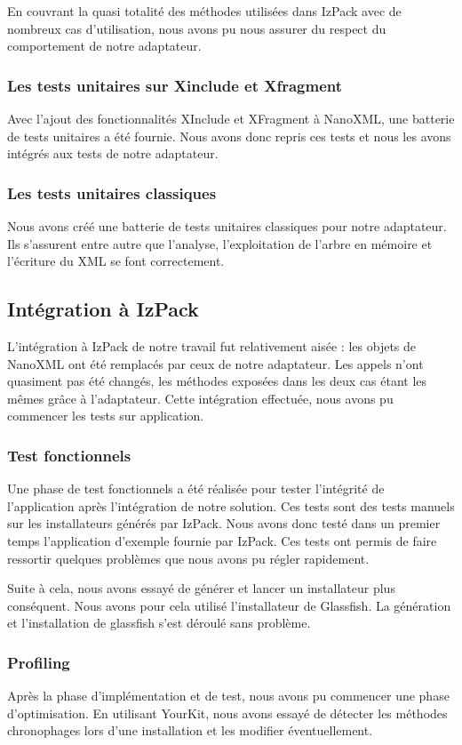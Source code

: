 En couvrant la quasi totalité des méthodes utilisées dans IzPack avec de nombreux cas d'utilisation, nous avons pu nous assurer du respect du comportement de notre adaptateur.

\subsubsection{Les tests unitaires sur Xinclude et Xfragment}
Avec l'ajout des fonctionnalités XInclude et XFragment à NanoXML, une batterie de tests unitaires a été fournie.
Nous avons donc repris ces tests et nous les avons intégrés aux tests de notre adaptateur.

\subsubsection{Les tests unitaires classiques}
Nous avons créé une batterie de tests unitaires classiques pour notre adaptateur.
Ils s'assurent entre autre que l'analyse, l'exploitation de l'arbre en mémoire et l'écriture du XML se font correctement.

\subsection{Intégration à IzPack}
L'intégration à IzPack de notre travail fut relativement aisée : les objets de NanoXML ont été remplacés par ceux de notre adaptateur.
Les appels n'ont quasiment pas été changés, les méthodes exposées dans les deux cas étant les mêmes grâce à l'adaptateur.
Cette intégration effectuée, nous avons pu commencer les tests sur application.
\subsubsection{Test fonctionnels}
Une phase de test fonctionnels a été réalisée pour tester l'intégrité de l'application après l'intégration de notre solution.
Ces tests sont des tests manuels sur les installateurs générés par IzPack.
Nous avons donc testé dans un premier temps l'application d'exemple fournie par IzPack.
Ces tests ont permis de faire ressortir quelques problèmes que nous avons pu régler rapidement.

Suite à cela, nous avons essayé de générer et lancer un installateur plus conséquent.
Nous avons pour cela utilisé l'installateur de Glassfish.
La génération et l'installation de glassfish s'est déroulé sans problème.
\subsubsection{Profiling}
Après la phase d'implémentation et de test, nous avons pu commencer une phase d'optimisation.
En utilisant YourKit, nous avons essayé de détecter les méthodes chronophages lors d'une installation et les modifier éventuellement.

